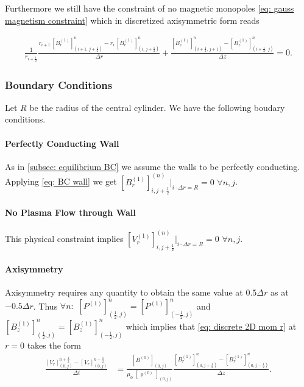 Furthermore we still have the constraint of no magnetic monopoles \eqref{eq: gauss magnetism constraint}
which in discretized axisymmetric form reads

\begin{align*}
    \frac{1}{r_{i+\frac{1}{2}}}
\frac{r_{i+1}\,[B_r^{(1)}]_{(i+1,\,j+\frac{1}{2})}^{n}
     - r_{i}\,[B_r^{(1)}]_{(i,\,j+\frac{1}{2})}^{n}}{\Delta r}
+
\frac{[B_z^{(1)}]_{(i+\frac{1}{2},\,j+1)}^{n}
     - [B_z^{(1)}]_{(i+\frac{1}{2},\,j)}^{n}}{\Delta z}
= 0.
\end{align*}







\subsubsection{Boundary Conditions}

Let $R$ be the radius of the central cylinder. We have the following boudary conditions.

\paragraph{Perfectly Conducting Wall}
As in \autoref{subsec: equilibrium BC} we assume the walls to be perfectly conducting.
Applying \eqref{eq: BC wall} we get $[B_r^{(1)}]_{i,j+\frac12}^{(n)}|_{i\cdot \Delta r=R} = 0$
$\forall n,j$.


\paragraph{No Plasma Flow through Wall} This physical constraint implies
 $[V_r^{(1)}]_{i,j+\frac12}^{(n)}|_{i\cdot \Delta r=R} = 0$
$\forall n,j$.



\paragraph{Axisymmetry} Axisymmetry requires any quantity to obtain the same value at
$0.5\Delta r$ as at $-0.5\Delta r$.
Thus $\forall n:$ $[P^{(1)}]_{(\frac12,j)}^{n} = [P^{(1)}]_{(-\frac12,j)}^{n}$
and $[B_z^{(1)}]_{(\frac12,j)}^{n} = [B_z^{(1)}]_{(-\frac12,j)}^{n}$ which implies that
\eqref{eq: discrete 2D mom r} at $r=0$ takes the form
\begin{align*}
    \frac{[V_r]_{(0,j)}^{n+\frac{1}{2}}-[V_r]_{(0,j)}^{n-\frac12}}{\Delta t}
    &=  \frac{[B^{(0)}]_{(0,j)}}{\mu_0 \;[\varrho^{(0)}]_{(0,j)}}
             \frac{[B_r^{(1)}]_{(0,j+\frac12)}^{n} - [B_r^{(1)}]_{(0,j-\frac12)}^{n}}{\Delta z}.
\end{align*}






